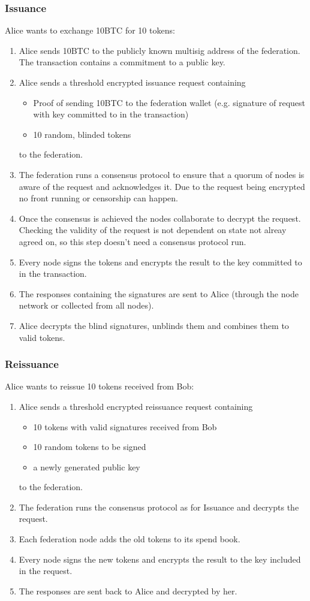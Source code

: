 \documentclass[10pt,a4paper,twocolumn]{article}
\begin{document}
\subsubsection{Issuance}
Alice wants to exchange 10BTC for 10 tokens:
\begin{enumerate}
	\item Alice sends 10BTC to the publicly known multisig address of the federation. The transaction contains a commitment to a public key.
	\item Alice sends a threshold encrypted issuance request containing 
	\begin{itemize}
		\item Proof of sending 10BTC to the federation wallet (e.g. signature of request with key committed to in the transaction)
		\item 10 random, blinded tokens
	\end{itemize}
	to the federation.
	\item The federation runs a consensus protocol to ensure that a quorum of nodes is aware of the request and acknowledges it. Due to the request being encrypted no front running or censorship can happen.
	\item Once the consensus is achieved the nodes collaborate to decrypt the request. Checking the validity of the request is not dependent on state not alreay agreed on, so this step doesn't need a consensus protocol run.
	\item Every node signs the tokens and encrypts the result to the key committed to in the transaction.
	\item The responses containing the signatures are sent to Alice (through the node network or collected from all nodes).
	\item Alice decrypts the blind signatures, unblinds them and combines them to valid tokens.
\end{enumerate}

\subsubsection{Reissuance}
Alice wants to reissue 10 tokens received from Bob:
\begin{enumerate}
	\item Alice sends a threshold encrypted reissuance request containing
	\begin{itemize}
		\item 10 tokens with valid signatures received from Bob
		\item 10 random tokens to be signed
		\item a newly generated public key
	\end{itemize}
	to the federation.
	\item The federation runs the consensus protocol as for Issuance and decrypts the request.
	\item Each federation node adds the old tokens to its spend book.
	\item Every node signs the new tokens and encrypts the result to the key included in the request.
	\item The responses are sent back to Alice and decrypted by her.
\end{enumerate}
\end{document}
